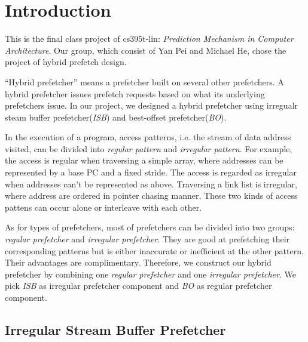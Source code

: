 \section{Introduction}
\label{sec:intro}

This is the final class project of cs395t-lin: \emph{Prediction Mechanism in Computer Architecture}. Our group, which consist of Yan Pei and Michael He, chose the project of hybrid prefetch design.

``Hybrid prefetcher'' means a prefetcher built on several other prefetchers. A hybrid prefetcher issues prefetch requests based on what its underlying prefetchers issue. In our project, we designed a hybrid prefetcher using irregualr steam buffer prefetcher(\emph{ISB})\cite{isbpaper} and best-offset prefetcher(\emph{BO})\cite{bopaper}.

In the execution of a program, access patterns, i.e. the stream of data address visited, can be divided into \emph{regular pattern} and \emph{irregular pattern}. For example, the access is regular when traversing a simple array, where addresses can be represented by a base PC and a fixed stride. The access is regarded as irregular when addresses can't be represented as above.  Traversing a link list is irregular, where address are ordered in pointer chasing manner. These two kinds of access pattens can occur alone or interleave with each other.

As for types of prefetchers, most of prefetchers can be divided into two groups: \emph{regular prefetcher}\cite{bopaper, sandboxpaper} and \emph{irregular prefetcher}\cite{isbpaper, ghbpaper, reinforcementlearning}.
They are good at prefetching their corresponding patterns but is either inaccurate or inefficient at the other pattern. Their advantages are complimentary.
Therefore, we construct our hybrid prefetcher by combining one \emph{regular prefetcher} and one \emph{irregular prefetcher}.
We pick \emph{ISB}\cite{isbpaper} as irregular prefetcher component and \emph{BO}\cite{bopaper} as regular prefetcher component.

  \subsection{Irregular Stream Buffer Prefetcher}
  \label{sec:isbintro}

